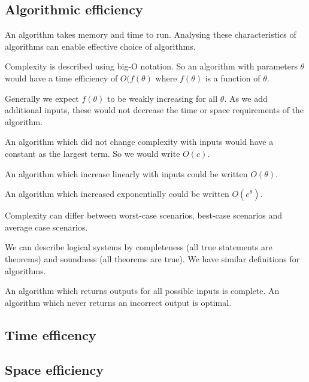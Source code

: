 
\subsection{Algorithmic efficiency}

An algorithm takes memory and time to run. Analysing these characteristics of algorithms can enable effective choice of algorithms.

Complexity is described using big-O notation. So an algorithm with parameters \(\theta \) would have a time efficiency of \(O(f(\theta )\) where \(f(\theta )\) is a function of \(\theta \).

Generally we expect \(f(\theta )\) to be weakly increasing for all \(\theta \). As we add additional inputs, these would not decrease the time or space requirements of the algorithm.

An algorithm which did not change complexity with inputs would have a constant as the largest term. So we would write \(O(c)\).

An algorithm which increase linearly with inputs could be written \(O(\theta )\).

An algorithm which increased exponentially could be written \(O(e^\theta )\).

Complexity can differ between worst-case scenarios, best-case scenarios and average case scenarios.

We can describe logical systems by completeness (all true statements are theorems) and soundness (all theorems are true). We have similar definitions for algorithms.

An algorithm which returns outputs for all possible inputs is complete. An algorithm which never returns an incorrect output is optimal.

\subsection{Time efficency}

\subsection{Space efficiency}

